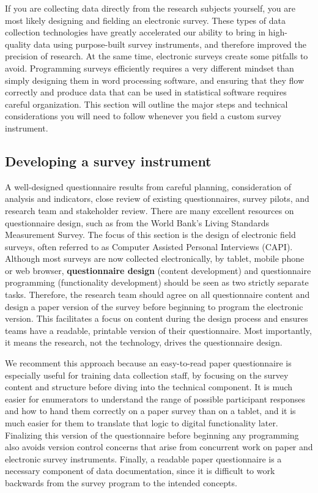 If you are collecting data directly from the research subjects yourself,
you are most likely designing and fielding an electronic survey.
These types of data collection technologies
have greatly accelerated our ability to bring in high-quality data
using purpose-built survey instruments,
and therefore improved the precision of research.
At the same time, electronic surveys create some pitfalls to avoid.
Programming surveys efficiently requires a very different mindset
than simply designing them in word processing software,
and ensuring that they flow correctly and produce data
that can be used in statistical software requires careful organization.
This section will outline the major steps and technical considerations
you will need to follow whenever you field a custom survey instrument.

\subsection{Developing a survey instrument}

A well-designed questionnaire results from careful planning,
consideration of analysis and indicators, close review of existing questionnaires,
survey pilots, and research team and stakeholder review.
There are many excellent resources on questionnaire design,
such as from the World Bank's Living Standards Measurement Survey.\cite{glewwe2000designing}
The focus of this section is the design of electronic field surveys,
often referred to as Computer Assisted Personal Interviews (CAPI).
Although most surveys are now collected electronically, by tablet, mobile phone or web browser,
\textbf{questionnaire design}
(content development) and questionnaire programming (functionality development)
should be seen as two strictly separate tasks.
Therefore, the research team should agree on all questionnaire content
and design a paper version of the survey before beginning to program the electronic version.
This facilitates a focus on content during the design process
and ensures teams have a readable, printable version of their questionnaire.
Most importantly, it means the research, not the technology, drives the questionnaire design.

We recomment this approach because an easy-to-read paper questionnaire
is especially useful for training data collection staff,
by focusing on the survey content and structure before diving into the technical component.
It is much easier for enumerators to understand the range of possible participant responses
and how to hand them correctly on a paper survey than on a tablet,
and it is much easier for them to translate that logic to digital functionality later.
Finalizing this version of the questionnaire before beginning any programming
also avoids version control concerns that arise from concurrent work
on paper and electronic survey instruments.
Finally, a readable paper questionnaire is a necessary component of data documentation,
since it is difficult to work backwards from the survey program to the intended concepts.


